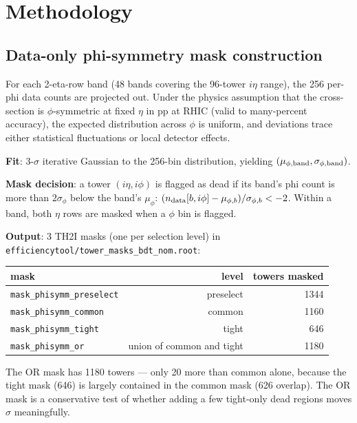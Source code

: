 \documentclass[11pt,a4paper]{article}
\begin{document}
\section{Methodology}
\label{sec:methodology}

\subsection{Data-only phi-symmetry mask construction}
\label{sec:phisymm}

For each 2-eta-row band (48 bands covering the 96-tower $i\eta$
range), the 256 per-phi data counts are projected out. Under the
physics assumption that the cross-section is $\phi$-symmetric at
fixed $\eta$ in pp at RHIC (valid to many-percent accuracy), the
expected distribution across $\phi$ is uniform, and deviations trace
either statistical fluctuations or local detector effects.

\textbf{Fit}: 3-$\sigma$ iterative Gaussian to the 256-bin
distribution, yielding $(\mu_{\phi,{\rm band}}, \sigma_{\phi,{\rm band}})$.

\textbf{Mask decision}: a tower $(i\eta, i\phi)$ is flagged as dead
if its band's phi count is more than $2\sigma_\phi$ below the band's
$\mu_\phi$:
$(n_{\rm data}[b, i\phi] - \mu_{\phi,b})/\sigma_{\phi,b} < -2$.
Within a band, both $\eta$ rows are masked when a $\phi$ bin is
flagged.

\textbf{Output}: 3 TH2I masks (one per selection level) in
\texttt{efficiencytool/tower\_masks\_bdt\_nom.root}:

\begin{center}
\begin{tabular}{lrr}
\toprule
mask & level & towers masked \\
\midrule
\texttt{mask\_phisymm\_preselect} & preselect & 1344 \\
\texttt{mask\_phisymm\_common}    & common    & 1160 \\
\texttt{mask\_phisymm\_tight}     & tight     &  646 \\
\texttt{mask\_phisymm\_or} & union of common and tight & 1180 \\
\bottomrule
\end{tabular}
\end{center}

The OR mask has 1180 towers --- only 20 more than common alone, because
the tight mask (646) is largely contained in the common mask (626
overlap). The OR mask is a conservative test of whether adding a few
tight-only dead regions moves $\sigma$ meaningfully.
\end{document}
